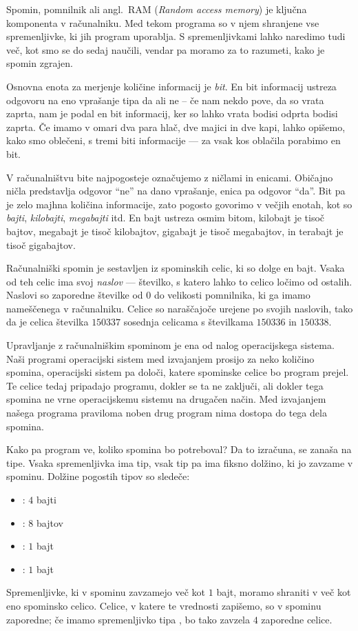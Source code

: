 
Spomin, pomnilnik ali angl.~RAM (\emph{Random access memory})
je ključna komponenta v računalniku. Med tekom programa so v njem shranjene vse
spremenljivke, ki jih program uporablja.
S spremenljivkami lahko naredimo tudi več, kot smo se do sedaj naučili, vendar
pa moramo za to razumeti, kako je spomin zgrajen.

Osnovna enota za merjenje količine informacij je \emph{bit}.
En bit informacij ustreza odgovoru na eno vprašanje tipa da ali ne
-- če nam nekdo pove, da so vrata zaprta, nam je podal en bit informacij,
ker so lahko vrata bodisi odprta bodisi zaprta.
Če imamo v omari dva para hlač, dve majici in dve kapi, lahko opišemo,
kako smo oblečeni, s tremi biti informacije --- za vsak kos oblačila porabimo
en bit.

V računalništvu bite najpogosteje označujemo z ničlami in enicami.
Običajno ničla predstavlja odgovor \enquote{ne} na dano vprašanje,
enica pa odgovor \enquote{da}.
Bit pa je zelo majhna količina informacije, zato pogosto govorimo v večjih
enotah, kot so \emph{bajti}, \emph{kilobajti}, \emph{megabajti} itd.
En bajt ustreza osmim bitom, kilobajt je tisoč bajtov, megabajt je tisoč
kilobajtov, gigabajt je tisoč megabajtov, in terabajt je tisoč gigabajtov.

Računalniški spomin je sestavljen iz spominskih celic, ki so dolge en bajt.
Vsaka od teh celic ima svoj \emph{naslov} --- številko, s katero lahko to
celico ločimo od ostalih.
Naslovi so zaporedne številke od $0$ do velikosti pomnilnika, ki ga imamo
nameščenega v računalniku.
Celice so naraščajoče urejene po svojih naslovih, tako da je celica številka
$150337$ sosednja celicama s številkama $150336$ in $150338$.

Upravljanje z računalniškim spominom je ena od nalog operacijskega sistema.
Naši programi operacijski sistem med izvajanjem prosijo za neko količino spomina,
operacijski sistem pa določi, katere spominske celice bo program prejel.
Te celice tedaj pripadajo programu, dokler se ta ne zaključi, ali dokler tega
spomina ne vrne operacijskemu sistemu na drugačen način.
Med izvajanjem našega programa praviloma noben drug program nima dostopa do tega
dela spomina.

Kako pa program ve, koliko spomina bo potreboval?
Da to izračuna, se zanaša na tipe.
Vsaka spremenljivka ima tip, vsak tip pa ima fiksno dolžino, ki jo zavzame v
spominu.
Dolžine pogostih tipov so sledeče:
\begin{itemize}
\item {}: $4$ bajti
\item {}: $8$ bajtov
\item {}: $1$ bajt
\item {}: $1$ bajt
\end{itemize}
Spremenljivke, ki v spominu zavzamejo več kot $1$ bajt, moramo shraniti v več
kot eno spominsko celico.
Celice, v katere te vrednosti zapišemo, so v spominu zaporedne; če imamo
spremenljivko tipa , bo tako zavzela $4$ zaporedne celice.

